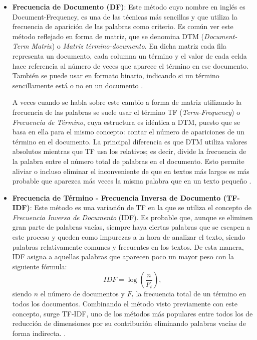 \documentclass[10pt, a4paper]{article}
\begin{document}
\begin{itemize}
  \item \textbf{Frecuencia de Documento (DF)}: Este método cuyo nombre en inglés es Document-Frequency, es una de las técnicas más sencillas y que utiliza la frecuencia de aparición de las palabras como criterio. Es común ver este método reflejado en forma de matriz, que se denomina  DTM (\textit{Document-Term Matrix}) o \textit{Matriz término-documento}. En dicha matriz cada fila representa un documento, cada columna un término y el valor de cada celda hace referencia al número de veces que aparece el término en ese documento. También se puede usar en formato binario, indicando si un término sencillamente está o no en un documento \cite{survey text, Document Representation and Dimension Reduction for Text Clustering, An Evaluation on Feature Selection for Text Clustering, Comparing and Combining Dimension Reduction Techniques for Efficient Text}.
  
  A veces cuando se habla sobre este cambio a forma de matriz utilizando la frecuencia de las palabras se suele usar el término TF (\textit{Term-Frequency}) o \textit{Frecuencia de Término}, cuya estructura es idéntica a DTM, puesto que se basa en ella para el mismo concepto: contar el número de apariciones de un término en el documento. La principal diferencia es que DTM utiliza valores absolutos mientras que TF usa los relativos; es decir, divide la frecuencia de la palabra entre el número total de palabras en el documento. Esto permite aliviar o incluso eliminar el inconveniente de que en textos más largos es más probable que aparezca más veces la misma palabra que en un texto pequeño \cite{text mining use of tf idf to examine the relevance of words to documents}.
  
  \item \textbf{Frecuencia de Término - Frecuencia Inversa de Documento (TF-IDF)}: Este método es una variación de TF en la que se utiliza el concepto de \textit{Frecuencia Inversa de Documento} (IDF). Es probable que, aunque se eliminen gran parte de palabras vacías, siempre haya ciertas palabras que se escapen a este proceso y queden como impurezas a la hora de analizar el texto, siendo palabras relativamente comunes y frecuentes en los textos. De esta manera, IDF asigna a aquellas palabras que aparecen poco un mayor peso con la siguiente fórmula: \begin{equation} IDF = \log \left( \frac{n}{F_t} \right), \end{equation} siendo $n$ el número de documentos y $F_t$ la frecuencia total de un término en todos los documentos. Combinando el método visto previamente con este concepto, surge TF-IDF, uno de los métodos más populares entre todos los de reducción de dimensiones por su contribución eliminando palabras vacías de forma indirecta. \cite{text mining use of tf idf to examine the relevance of words to documents, A comparative study of tf idf lsi and multi words for text classification, Document clustering tfidf approach}.
  

\end{itemize}
\end{document}
